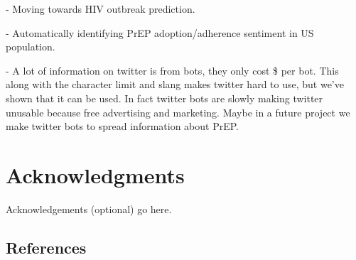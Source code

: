 \documentclass{sig-alternate-05-2015}
\begin{document}
- Moving towards HIV outbreak prediction. 

- Automatically identifying PrEP adoption/adherence sentiment in US population.

- A lot of information on twitter is from bots, they only cost \$ per bot. This along with the character limit and slang makes twitter hard to use, but we've shown that it can be used. In fact twitter bots are slowly making twitter unusable because free advertising and marketing. Maybe in a future project we make twitter bots to spread information about PrEP.


\section{Acknowledgments}

Acknowledgements (optional) go here.

%

%
%


\subsection{References}
\end{document}

